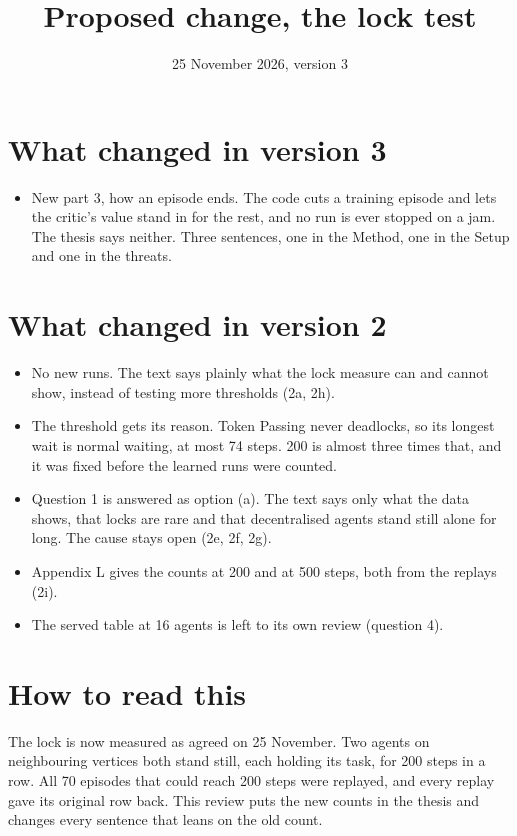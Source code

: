 \documentclass[11pt,a4paper]{article}
\title{Proposed change, the lock test}
\date{25 November 2026, version 3}
\begin{document}
\sloppy
\maketitle

\section*{What changed in version 3}
\begin{itemize}[nosep]
  \item New part 3, how an episode ends. The code cuts a training episode
    and lets the critic's value stand in for the rest, and no run is ever
    stopped on a jam. The thesis says neither. Three sentences, one in the
    Method, one in the Setup and one in the threats.
\end{itemize}

\section*{What changed in version 2}
\begin{itemize}[nosep]
  \item No new runs. The text says plainly what the lock measure can and
    cannot show, instead of testing more thresholds (2a, 2h).
  \item The threshold gets its reason. Token Passing never deadlocks, so its
    longest wait is normal waiting, at most 74 steps. 200 is almost three
    times that, and it was fixed before the learned runs were counted.
  \item Question 1 is answered as option (a). The text says only what the
    data shows, that locks are rare and that decentralised agents stand
    still alone for long. The cause stays open (2e, 2f, 2g).
  \item Appendix L gives the counts at 200 and at 500 steps, both from the
    replays (2i).
  \item The served table at 16 agents is left to its own review (question 4).
\end{itemize}

\section*{How to read this}
The lock is now measured as agreed on 25 November. Two agents on
neighbouring vertices both stand still, each holding its task, for 200 steps
in a row. All 70 episodes that could reach 200 steps were replayed, and every
replay gave its original row back. This review puts the new counts in the
thesis and changes every sentence that leans on the old count.
\end{document}
